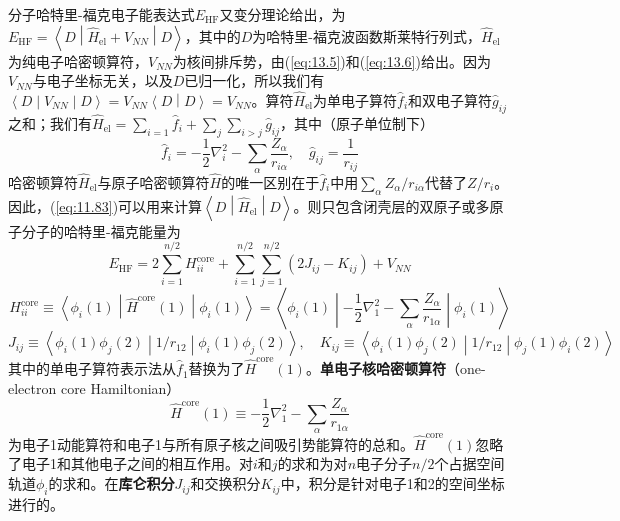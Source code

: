    分子哈特里-福克电子能表达式$E_{\text{HF}}$又变分理论给出，为$E_{\text{HF}} = \left\langle D \middle| \hat{H}_{\text{el}} + V_{NN} \middle| D \right\rangle$，其中的$D$为哈特里-福克波函数斯莱特行列式，$\hat{H}_{\text{el}}$为纯电子哈密顿算符，$V_{NN}$为核间排斥势，由(\ref{eq:13.5})和(\ref{eq:13.6})给出。因为$V_{NN}$与电子坐标无关，以及$D$已归一化，所以我们有$\left\langle D \middle| V_{NN} \middle| D \right\rangle = V_{NN} \left\langle D \middle| D \right\rangle = V_{NN}$。算符$\hat{H}_{\text{el}}$为单电子算符$\hat{f}_i$和双电子算符$\hat{g}_{ij}$之和；我们有$\hat{H}_{\text{el}} = \sum_{i=1} \hat{f}_i + \sum_{j}\sum_{i>j} \hat{g}_{ij}$，其中（原子单位制下）
    \begin{equation*}
        \hat{f}_i = -\frac{1}{2} \nabla_i^2 - \sum_{\alpha} \frac{Z_{\alpha}}{r_{i\alpha}}, \quad \hat{g}_{ij} = \frac{1}{r_{ij}}
    \end{equation*}
    哈密顿算符$\hat{H}_{\text{el}}$与原子哈密顿算符$\hat{H}$的唯一区别在于$\hat{f}_i$中用$\sum_{\alpha} {Z_{\alpha}}/{r_{i\alpha}}$代替了${Z}/{r_i}$。因此，(\ref{eq:11.83})可以用来计算$\left\langle D \middle| \hat{H}_{\text{el}} \middle| D \right\rangle$。则只包含闭壳层的双原子或多原子分子的哈特里-福克能量为
    \begin{equation}
        E_{\text{HF}} = 2\sum_{i=1}^{n/2} H^{\text{core}}_{ii} + \sum_{i=1}^{n/2} \sum_{j=1}^{n/2} \left(2J_{ij} - K_{ij}\right) + V_{NN}
        \label{eq:14.22}
    \end{equation}
    \begin{equation}
        H^{\text{core}}_{ii} \equiv \left\langle \phi_i\left(1\right) \middle| \hat{H}^{\text{core}}\left(1\right) \middle| \phi_i\left(1\right) \right\rangle = \left\langle \phi_i \left(1\right) \middle| -\frac{1}{2} \nabla_1^2 - \sum_{\alpha} \frac{Z_{\alpha}}{r_{1\alpha}} \middle| \phi_i \left(1\right) \right\rangle
        \label{eq:14.23}
    \end{equation}
    \begin{equation}
        J_{ij} \equiv \left\langle \phi_i\left(1\right) \phi_j\left(2\right) \middle| 1/r_{12} \middle| \phi_i\left(1\right) \phi_j\left(2\right) \right\rangle, \quad K_{ij} \equiv \left\langle \phi_i\left(1\right) \phi_j\left(2\right) \middle| 1/r_{12} \middle| \phi_j\left(1\right) \phi_i\left(2\right) \right\rangle
        \label{eq:14.24}
    \end{equation}
    其中的单电子算符表示法从$\hat{f}_1$替换为了$\hat{H}^{\text{core}}\left(1\right)$。\textbf{单电子核哈密顿算符}（one-electron core Hamiltonian）
    \begin{equation*}
        \hat{H}^{\text{core}}\left(1\right) \equiv -\frac{1}{2} \nabla_1^2 - \sum_{\alpha} \frac{Z_{\alpha}}{r_{1\alpha}}
    \end{equation*}
    为电子1动能算符和电子1与所有原子核之间吸引势能算符的总和。$\hat{H}^{\text{core}}\left(1\right)$忽略了电子1和其他电子之间的相互作用。对$i$和$j$的求和为对$n$电子分子$n/2$个占据空间轨道$\phi_i$的求和。在\textbf{库仑积分}$J_{ij}$和交换积分$K_{ij}$中，积分是针对电子1和2的空间坐标进行的。

